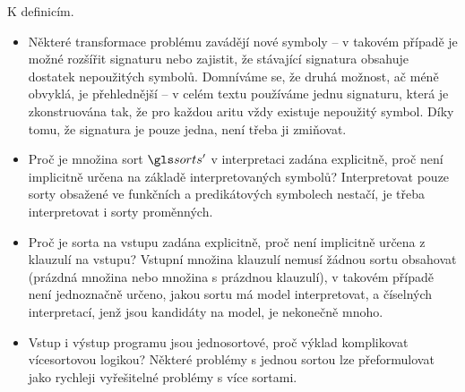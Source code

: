 \begin{note}
K definicím.
\begin{itemize}
\item Některé transformace problému zavádějí nové symboly --
  v takovém případě je možné rozšířit signaturu nebo zajistit,
  že stávající signatura obsahuje dostatek nepoužitých symbolů. Domníváme se,
  že druhá možnost, ač méně obvyklá, je přehlednější --
  v celém textu používáme jednu signaturu, která je
  zkonstruována tak, že pro každou aritu vždy existuje
  nepoužitý symbol. Díky tomu, že signatura je pouze jedna,
  není třeba ji zmiňovat.
\item Proč je množina sort $\sorts'$ v interpretaci zadána explicitně, proč
  není implicitně určena na základě interpretovaných symbolů?
  Interpretovat pouze sorty obsažené ve funkčních a predikátových
  symbolech nestačí, je třeba interpretovat i sorty proměnných.
\item Proč je sorta na vstupu zadána explicitně, proč není implicitně určena
  z klauzulí na vstupu? Vstupní množina klauzulí nemusí žádnou sortu
  obsahovat (prázdná množina nebo množina s prázdnou klauzulí), v takovém
  případě není
  jednoznačně určeno, jakou sortu má model interpretovat, a číselných
  interpretací, jenž jsou kandidáty na model, je nekonečně mnoho.
\item Vstup i výstup programu jsou jednosortové, proč výklad komplikovat
  více\-sor\-tovou logikou? Některé problémy s jednou sortou
  lze přeformulovat jako rychleji vyřešitelné problémy s více sortami.
\end{itemize}
\end{note}
